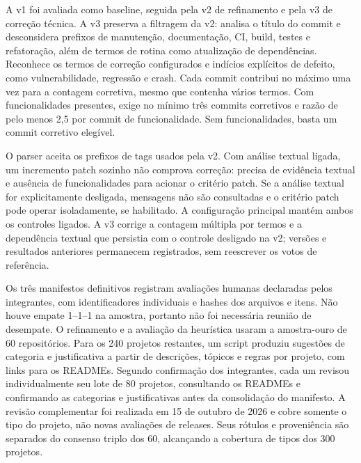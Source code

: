 A v1 foi avaliada como baseline, seguida pela v2 de refinamento e pela v3 de
correção técnica. A v3 preserva a filtragem da v2: analisa o título do commit e
desconsidera prefixos de manutenção, documentação, CI, build, testes e refatoração,
além de termos de rotina como atualização de dependências. Reconhece os termos
de correção configurados e indícios explícitos de defeito, como vulnerabilidade,
regressão e crash. Cada commit contribui no máximo uma vez para a contagem
corretiva, mesmo que contenha vários termos. Com funcionalidades presentes,
exige no mínimo três commits corretivos e razão de pelo menos 2,5 por commit
de funcionalidade. Sem funcionalidades, basta um commit corretivo elegível.

O parser aceita os prefixos de tags usados pela v2. Com análise textual ligada,
um incremento patch sozinho não comprova correção: precisa de evidência textual
e ausência de funcionalidades para acionar o critério patch. Se a análise textual
for explicitamente desligada, mensagens não são consultadas e o critério patch
pode operar isoladamente, se habilitado. A configuração principal mantém ambos
os controles ligados. A v3 corrige a contagem múltipla por termos e a dependência
textual que persistia com o controle desligado na v2; versões e resultados
anteriores permanecem registrados, sem reescrever os votos de referência.

Os três manifestos definitivos registram avaliações humanas declaradas pelos integrantes, com
identificadores individuais e hashes dos arquivos e itens. Não houve empate
1--1--1 na amostra, portanto não foi necessária reunião de desempate. O refinamento
e a avaliação da heurística usaram a amostra-ouro de 60 repositórios. Para os 240
projetos restantes, um script produziu sugestões de categoria e justificativa
a partir de descrições, tópicos e regras por projeto, com links para os READMEs.
Segundo confirmação dos integrantes, cada um revisou individualmente seu lote de
80 projetos, consultando os READMEs e confirmando as categorias e justificativas
antes da consolidação do manifesto. A revisão complementar foi realizada em
15 de outubro de 2026 e cobre somente o tipo do projeto, não novas avaliações
de releases. Seus rótulos e proveniência são separados do consenso triplo dos 60,
alcançando a cobertura de tipos dos 300 projetos.


